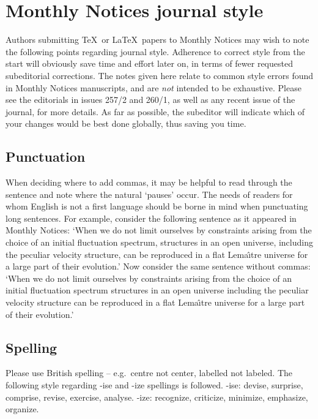 \section{Monthly Notices journal style}
        
Authors  submitting  \TeX\ or \LaTeX\ papers to Monthly  Notices  
may wish to note the following points regarding journal style. 
Adherence to correct style from the start will obviously save time
and effort later on, in terms of fewer requested subeditorial 
corrections.  The notes given here relate to common style errors found 
in  Monthly Notices manuscripts, and are {\it not\/} intended to  be  
exhaustive. Please see the editorials in issues 257/2 and 260/1, as 
well as any recent issue of the journal, for more details. As far 
as  possible, the subeditor will indicate which of  your  changes 
would be best done globally, thus saving you time.
        
\subsection{Punctuation}

When  deciding  where to add commas, it may be  helpful  to  read 
through  the sentence and note where the natural `pauses'  occur. 
The  needs  of readers for whom English is not a  first  language 
should  be  borne in mind when punctuating  long  sentences.  For 
example, consider the following sentence as it appeared in Monthly Notices:
`When we do not limit ourselves by constraints arising 
from the choice of an initial fluctuation spectrum, structures in 
an open universe, including the peculiar velocity structure,  can 
be  reproduced  in a flat Lema\^{\i}tre universe for a large  part  of 
their evolution.' Now consider the same sentence without  commas: 
`When  we do not limit ourselves by constraints arising from  the 
choice  of an initial fluctuation spectrum structures in an  open 
universe including the peculiar velocity structure can be  reproduced  
in  a  flat Lema\^{\i}tre universe for a large  part  of  their 
evolution.'
        
\subsection{Spelling}

Please  use British spelling -- e.g.\ centre not center,  labelled 
not  labeled. The following style regarding -ise and -ize  spellings  is
followed.  -ise: devise,  surprise,  comprise,  revise, 
exercise,  analyse. -ize: recognize, criticize, minimize,  emphasize, organize.
        
